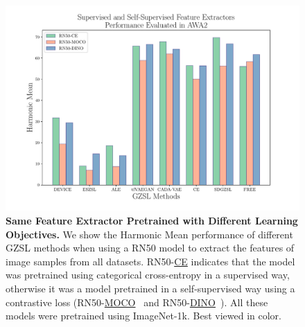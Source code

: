 \begin{figure}[bp]
\begin{minipage}[t]{0.33\textwidth}
\end{minipage}%
\hfill
\begin{minipage}[t]{0.33\textwidth}
  \includegraphics[align=t,width=\linewidth]{Images/awa2_diff_objs.pdf}
\end{minipage}%
 \caption{\textbf{Same Feature Extractor Pretrained with Different Learning Objectives.} We show the Harmonic Mean performance of different GZSL methods when using a RN50 model to extract the features of image samples from all datasets. RN50-\underline{CE} indicates that the model was pretrained using categorical cross-entropy in a supervised way, otherwise it was a model pretrained in a self-supervised way using a contrastive loss (RN50-\underline{MOCO}~\cite{MoCo} and RN50-\underline{DINO}~\cite{DINO}). All these models were pretrained using ImageNet-1k. Best viewed in color.}
 \label{fig:model_backbone_diff_objectives}
\end{figure}
